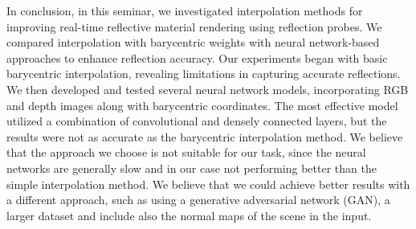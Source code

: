 In conclusion, in this seminar, we investigated interpolation methods for improving real-time reflective material rendering using reflection probes. 
We compared interpolation with barycentric weights with neural network-based approaches to enhance reflection accuracy.
Our experiments began with basic barycentric interpolation, revealing limitations in capturing accurate reflections.
We then developed and tested several neural network models, incorporating RGB and depth images along with barycentric coordinates. 
The most effective model utilized a combination of convolutional and densely connected layers, but the results were not as accurate as the barycentric interpolation method.
We believe that the approach we choose is not suitable for our task, since the neural networks are generally slow and in our case not performing better than the simple interpolation method.
We believe that we could achieve better results with a different approach, such as using a generative adversarial network (GAN), a larger dataset and include also the normal maps of the scene in the input.


%




\newpage





 